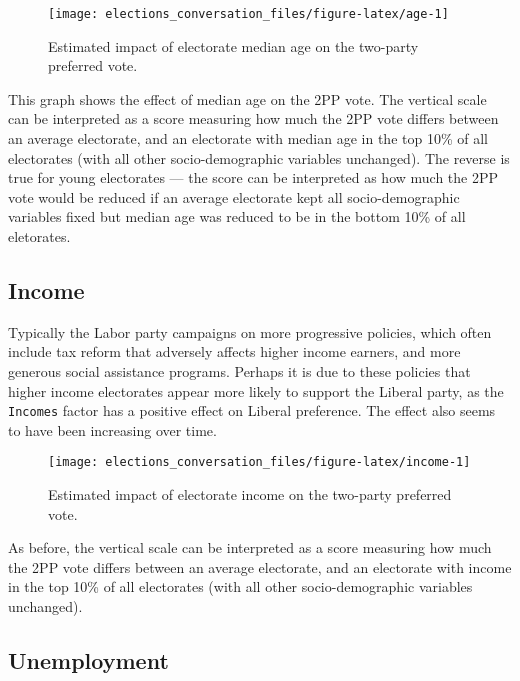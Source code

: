 \documentclass[11pt,a4paper,]{article}
\begin{document}
\begin{figure}[H]

{\centering \texttt{[image: elections\_conversation\_files/figure-latex/age-1]} 

}

\caption{Estimated impact of electorate median age on the two-party preferred vote.}\label{fig:age}
\end{figure}

This graph shows the effect of median age on the 2PP vote. The vertical scale can be interpreted as a score measuring how much the 2PP vote differs between an average electorate, and an electorate with median age in the top 10\% of all electorates (with all other socio-demographic variables unchanged). The reverse is true for young electorates --- the score can be interpreted as how much the 2PP vote would be reduced if an average electorate kept all socio-demographic variables fixed but median age was reduced to be in the bottom 10\% of all eletorates.

\hypertarget{income}{%
\subsection*{Income}\label{income}}

Typically the Labor party campaigns on more progressive policies, which often include tax reform that adversely affects higher income earners, and more generous social assistance programs. Perhaps it is due to these policies that higher income electorates appear more likely to support the Liberal party, as the \texttt{Incomes} factor has a positive effect on Liberal preference. The effect also seems to have been increasing over time.

\begin{figure}[H]

{\centering \texttt{[image: elections\_conversation\_files/figure-latex/income-1]} 

}

\caption{Estimated impact of electorate income on the two-party preferred vote.}\label{fig:income}
\end{figure}

As before, the vertical scale can be interpreted as a score measuring how much the 2PP vote differs between an average electorate, and an electorate with income in the top 10\% of all electorates (with all other socio-demographic variables unchanged).

\hypertarget{unemployment}{%
\subsection*{Unemployment}\label{unemployment}}
\end{document}
